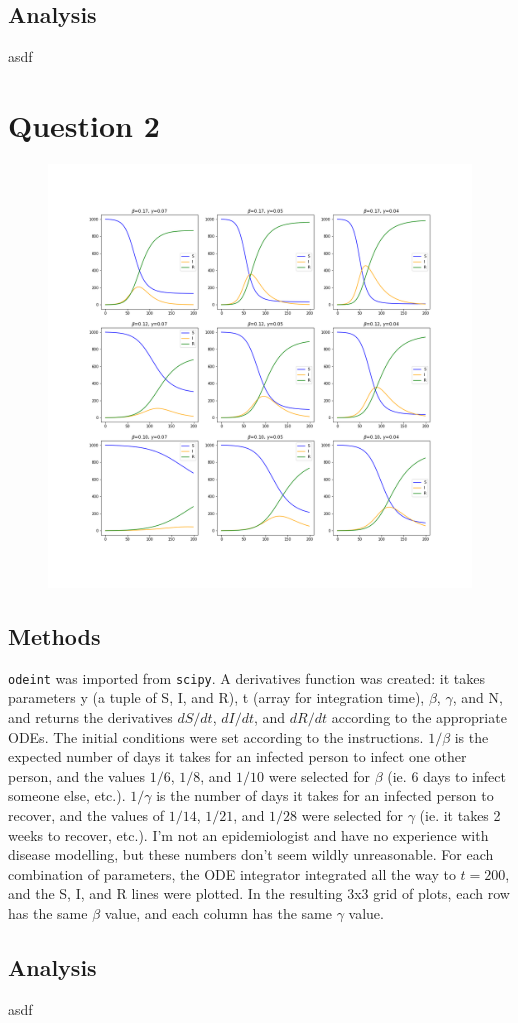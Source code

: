 \documentclass{article}
\newcommand{\code}[1]{\texttt{#1}}
\begin{document}
\subsection*{Analysis}

asdf

\newpage 

\section*{Question 2}

\begin{figure}[!htbp]
	\centering
	\includegraphics[width=1.2\linewidth]{q2.png}
\end{figure}

\subsection*{Methods}

\code{odeint} was imported from \code{scipy}. A derivatives function was created: it takes parameters y (a tuple of S, I, and R), t (array for integration time), $\beta$, $\gamma$, and N, and returns the derivatives $dS/dt$, $dI/dt$, and $dR/dt$ according to the appropriate ODEs. The initial conditions were set according to the instructions. $1/\beta$ is the expected number of days it takes for an infected person to infect one other person, and the values $1/6$, $1/8$, and $1/10$ were selected for $\beta$ (ie. 6 days to infect someone else, etc.). $1/\gamma$ is the number of days it takes for an infected person to recover, and the values of $1/14$, $1/21$, and $1/28$ were selected for $\gamma$ (ie. it takes 2 weeks to recover, etc.). I'm not an epidemiologist and have no experience with disease modelling, but these numbers don't seem wildly unreasonable. For each combination of parameters, the ODE integrator integrated all the way to $t=200$, and the S, I, and R lines were plotted. In the resulting 3x3 grid of plots, each row has the same $\beta$ value, and each column has the same $\gamma$ value. 

\subsection*{Analysis}

asdf
\end{document}
